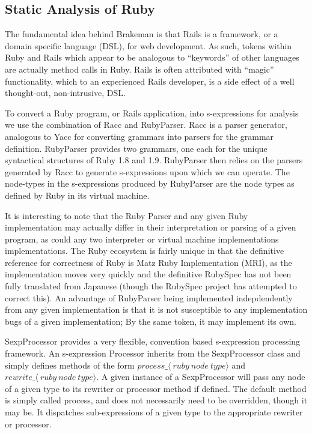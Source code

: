 \documentclass[conference]{IEEEtran}
\begin{document}
\subsection{Static Analysis of Ruby}

The fundamental idea behind Brakeman is that Rails is a framework, or a
domain specific language (DSL), for web development.  As such, tokens within Ruby and
Rails which appear to be analogous to ``keywords'' of other languages are
actually method calls in Ruby.  Rails is often attributed with ``magic''
functionality, which to an experienced Rails developer, is a side effect of a
well thought-out, non-intrusive, DSL.

To convert a Ruby program, or Rails application, into s-expressions for analysis
we use the combination of Racc\cite{racc} and RubyParser\cite{ruby_parser}.  Racc is a parser
generator, analogous to Yacc\cite{yacc} for converting grammars into parsers for the
grammar definition.  RubyParser provides two grammars, one each for the unique
syntactical structures of Ruby 1.8 and 1.9.  RubyParser then relies on the
parsers generated by Racc to generate s-expressions upon which we can
operate.  The node-types in the s-expressions produced by RubyParser are the
node types as defined by Ruby\cite{ruby_node_types} in its virtual machine.

It is interesting to note that the Ruby Parser and any given Ruby implementation
may actually differ in their interpretation or parsing of a given program, as
could any two interpreter or virtual machine implementations implementations.
The Ruby ecosystem is fairly unique in that the definitive reference for
correctness of Ruby is Matz Ruby Implementation (MRI), as the implementation
moves very quickly and the definitive RubySpec has not been fully translated
from Japanese (though the RubySpec project has attempted to correct this).  An
advantage of RubyParser being implemented indepdendently from any given
implementation is that it is not susceptible to any implementation bugs of a
given implementation;  By the same token, it may implement its own.

SexpProcessor\cite{sexp_processor} provides a very flexible, convention based
s-expression processing framework.  An s-expression Processor inherits from the
SexpProcessor class and simply defines methods of the form
$process\_\langle~ruby~node~type\rangle$ and
$rewrite\_\langle~ruby~node~type\rangle$.  A given instance of a SexpProcessor
will pass any node of a given type to its rewriter or processor method if
defined.  The default method is simply called process, and does not necessarily
need to be overridden, though it may be.  It dispatches sub-expressions of a
given type to the appropriate rewriter or processor.
\end{document}
